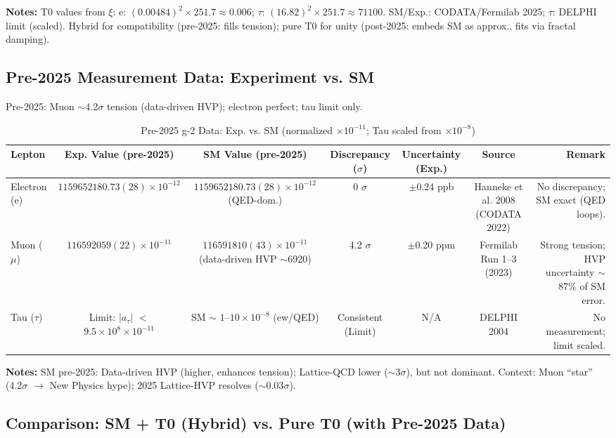 \documentclass[12pt,a4paper]{article}
\begin{document}
	\textbf{Notes:} T0 values from $\xi$: e: $(0.00484)^2 \times 251.7 \approx 0.006$; $\tau$: $(16.82)^2 \times 251.7 \approx 71100$. SM/Exp.: CODATA/Fermilab 2025; $\tau$: DELPHI limit (scaled). Hybrid for compatibility (pre-2025: fills tension); pure T0 for unity (post-2025: embeds SM as approx., fits via fractal damping).
	
	\subsection{Pre-2025 Measurement Data: Experiment vs. SM}
	
	Pre-2025: Muon $\sim$4.2$\sigma$ tension (data-driven HVP); electron perfect; tau limit only.
	
	\begin{table}[ht!]
		\centering
		\small
		\begin{adjustbox}{max width=\textwidth}
			\begin{tabular}{lcccccr}
				\toprule
				Lepton & Exp. Value (pre-2025) & SM Value (pre-2025) & Discrepancy ($\sigma$) & Uncertainty (Exp.) & Source & Remark \\
				\midrule
				Electron (e) & $1159652180.73(28) \times 10^{-12}$ & $1159652180.73(28) \times 10^{-12}$ (QED-dom.) & 0 $\sigma$ & $\pm$0.24 ppb & Hanneke et al. 2008 (CODATA 2022) & No discrepancy; SM exact (QED loops). \\
				Muon ($\mu$) & $116592059(22) \times 10^{-11}$ & $116591810(43) \times 10^{-11}$ (data-driven HVP $\sim$6920) & 4.2 $\sigma$ & $\pm$0.20 ppm & Fermilab Run 1--3 (2023) & Strong tension; HVP uncertainty $\sim$87\% of SM error. \\
				Tau ($\tau$) & Limit: $|a_\tau|$ $<$ $9.5 \times 10^{8} \times 10^{-11}$ & SM $\sim$ $1$--$10 \times 10^{-8}$ (ew/QED) & Consistent (Limit) & N/A & DELPHI 2004 & No measurement; limit scaled. \\
				\bottomrule
			\end{tabular}
		\end{adjustbox}
		\caption{Pre-2025 g-2 Data: Exp. vs. SM (normalized $ \times 10^{-11}$; Tau scaled from $ \times 10^{-8}$)}
		\label{tab:pre2025}
	\end{table}
	
	\textbf{Notes:} SM pre-2025: Data-driven HVP (higher, enhances tension); Lattice-QCD lower ($\sim$3$\sigma$), but not dominant. Context: Muon ``star'' (4.2$\sigma$ $\to$ New Physics hype); 2025 Lattice-HVP resolves ($\sim$0.03$\sigma$).
	
	\subsection{Comparison: SM + T0 (Hybrid) vs. Pure T0 (with Pre-2025 Data)}
	
\end{document}
